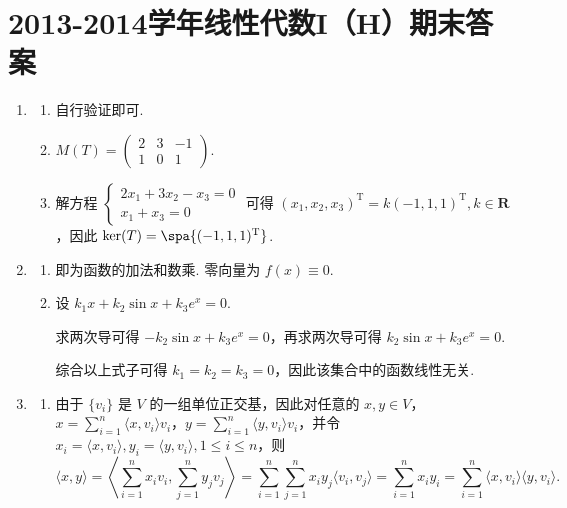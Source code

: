 \section{2013-2014学年线性代数I（H）期末答案}

\begin{enumerate}
    \item \begin{enumerate}
        \item 自行验证即可.
        \item $M(T)=\begin{pmatrix}
            2 & 3 & -1 \\
            1 & 0 & 1
        \end{pmatrix}$.
        \item 解方程 $\begin{cases}
            2x_1 + 3x_2 - x_3 = 0 \\
            x_1 + x_3 = 0
        \end{cases}$ 可得 $(x_1,x_2,x_3)^\mathrm{T} = k(-1, 1, 1)^\mathrm{T}, k \in \mathbf{R}$，因此 $\ker(T) = \spa\{(-1,1,1)^\mathrm{T}\}$.
    \end{enumerate}

    \item \begin{enumerate}
        \item 即为函数的加法和数乘. 零向量为 $f(x) \equiv 0$.
        \item 设 $k_1 x + k_2 \sin x + k_3 e^x = 0$.

        求两次导可得 $-k_2 \sin x + k_3 e^x = 0$，再求两次导可得 $k_2 \sin x + k_3 e^x = 0$.

        综合以上式子可得 $k_1=k_2=k_3=0$，因此该集合中的函数线性无关.
    \end{enumerate}

    \item \begin{enumerate}
        \item 由于 $\{v_i\}$ 是 $V$ 的一组单位正交基，因此对任意的 $x, y \in V$，$x=\displaystyle\sum_{i=1}^n \langle x, v_i \rangle v_i$，$y=\displaystyle\sum_{i=1}^n \langle y, v_i \rangle v_i$，并令 $x_i = \langle x, v_i \rangle, y_i = \langle y, v_i \rangle, 1\leqslant i \leqslant n$，则
        \[
            \langle x, y \rangle = \left\langle \sum_{i=1}^n x_i v_i, \sum_{j=1}^n y_j v_j \right\rangle = \sum_{i=1}^n \sum_{j=1}^n x_i y_j \langle v_i, v_j \rangle = \sum_{i=1}^n x_i y_i = \sum_{i=1}^n \langle x, v_i \rangle \langle y, v_i \rangle.
        \]


\end{enumerate}
\end{enumerate}
